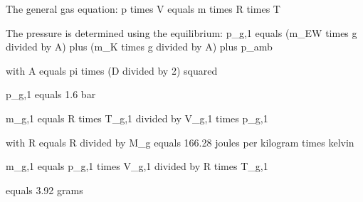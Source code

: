 The general gas equation:  
p times V equals m times R times T  

The pressure is determined using the equilibrium:  
p_g,1 equals (m_EW times g divided by A) plus (m_K times g divided by A) plus p_amb  

with A equals pi times (D divided by 2) squared  

p_g,1 equals 1.6 bar  

m_g,1 equals R times T_g,1 divided by V_g,1 times p_g,1  

with R equals R divided by M_g equals 166.28 joules per kilogram times kelvin  

m_g,1 equals p_g,1 times V_g,1 divided by R times T_g,1  

equals 3.92 grams